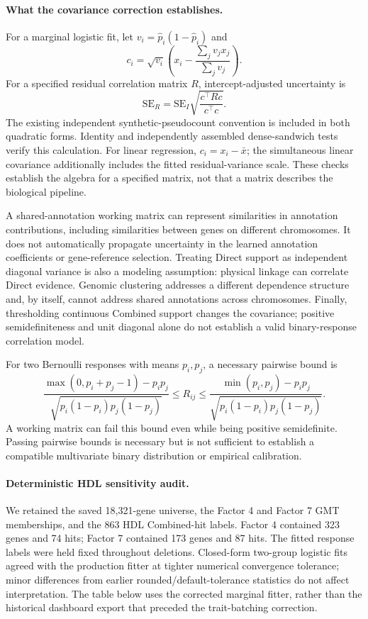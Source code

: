 \paragraph{What the covariance correction establishes.}
For a marginal logistic fit, let $v_i=\widehat p_i(1-\widehat p_i)$ and
\[
 c_i=\sqrt{v_i}\left(x_i-\frac{\sum_jv_jx_j}{\sum_jv_j}\right).
\]
For a specified residual correlation matrix $R$, intercept-adjusted uncertainty is
\begin{equation}
 \mathrm{SE}_R=\mathrm{SE}_I
 \sqrt{\frac{c^\top R c}{c^\top c}}.
 \label{eq:gene_dependence_sandwich}
\end{equation}
The existing independent synthetic-pseudocount convention is included in both quadratic forms. Identity and independently assembled dense-sandwich tests verify this calculation. For linear regression, $c_i=x_i-\bar x$; the simultaneous linear covariance additionally includes the fitted residual-variance scale. These checks establish the algebra for a specified matrix, not that a matrix describes the biological pipeline.

A shared-annotation working matrix can represent similarities in annotation contributions, including similarities between genes on different chromosomes. It does not automatically propagate uncertainty in the learned annotation coefficients or gene-reference selection. Treating Direct support as independent diagonal variance is also a modeling assumption: physical linkage can correlate Direct evidence. Genomic clustering addresses a different dependence structure and, by itself, cannot address shared annotations across chromosomes. Finally, thresholding continuous Combined support changes the covariance; positive semidefiniteness and unit diagonal alone do not establish a valid binary-response correlation model.

For two Bernoulli responses with means $p_i,p_j$, a necessary pairwise bound is
\begin{equation}
 \frac{\max(0,p_i+p_j-1)-p_ip_j}{\sqrt{p_i(1-p_i)p_j(1-p_j)}}
 \le R_{ij}\le
 \frac{\min(p_i,p_j)-p_ip_j}{\sqrt{p_i(1-p_i)p_j(1-p_j)}}.
 \label{eq:binary_correlation_bounds}
\end{equation}
A working matrix can fail this bound even while being positive semidefinite. Passing pairwise bounds is necessary but is not sufficient to establish a compatible multivariate binary distribution or empirical calibration.

\paragraph{Deterministic HDL sensitivity audit.}
We retained the saved 18,321-gene universe, the Factor 4 and Factor 7 GMT memberships, and the 863 HDL Combined-hit labels. Factor 4 contained 323 genes and 74 hits; Factor 7 contained 173 genes and 87 hits. The fitted response labels were held fixed throughout deletions. Closed-form two-group logistic fits agreed with the production fitter at tighter numerical convergence tolerance; minor differences from earlier rounded/default-tolerance statistics do not affect interpretation. The table below uses the corrected marginal fitter, rather than the historical dashboard export that preceded the trait-batching correction.

